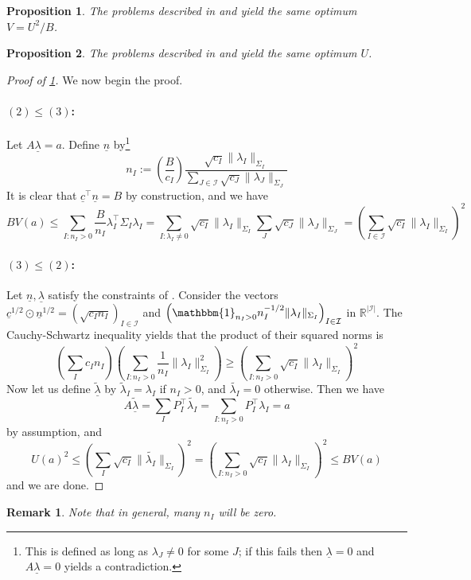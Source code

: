 \documentclass{article} %
\newcommand{\R}{\mathbb{R}}
\newtheorem{proposition}[proposition]{Proposition}
\newtheorem{remark}[theorem]{Remark}
\newcommand{\I}{\mathbbm{1}}
\begin{document}
\begin{proposition}\label{prop:og-primal}
    The problems described in  and  yield the same optimum $V=U^2/B$.
\end{proposition}
\begin{proposition}\label{prop:primal-dual}
    The problems described in  and  yield the same optimum $U$.
\end{proposition}
\begin{proof}[Proof of \cref{prop:og-primal}] We now begin the proof.
    \paragraph{$(2)\leq  (3)$:} Let $A\underline{\lambda}=a$. Define $\underline{n}$ by\footnote{This is defined as long as $\lambda_J\neq0$ for some $J$; if this fails then $\underline{\lambda}=0$ and $A\underline{\lambda}=0$ yields a contradiction.}
    \[
    n_I:=\left(\frac{B}{c_I}\right) \frac{\sqrt{c_I}\|\lambda_I\|_{\Sigma_I}}{\sum_{J\in\mathcal{I}} \sqrt{c_J} \|\lambda_J\|_{\Sigma_J}}
    \]
    It is clear that $\underline{c}^\top\underline{n}=B$ by construction, and we have
    \[
    BV(a) \leq \sum_{I:n_I>0} \frac{B}{n_I} \lambda_I^\top\Sigma_I\lambda_I = \sum_{I:\lambda_I\neq0} \sqrt{c_I}\|\lambda_I\|_{\Sigma_I} \sum_{J}\sqrt{c_J}\|\lambda_J\|_{\Sigma_J} = \left(\sum_{I\in\mathcal{I}}\sqrt{c_I}\|\lambda_I\|_{\Sigma_I}\right)^2
    \]
    \paragraph{$(3)\leq(2)$:} Let $\underline{n},\underline{\lambda}$ satisfy the constraints of . Consider the vectors $\underline{c}^{1/2}\odot \underline{n}^{1/2}=(\sqrt{c_In_I})_{I\in\mathcal{I}}$ and $\left(\I_{n_I>0}n_I^{-1/2} \|\lambda_I\|_{\Sigma_I}\right)_{I\in\mathcal{I}}$ in $\R^{|\mathcal{I}|}$. The Cauchy-Schwartz inequality yields that the product of their squared norms is
    \[
    \left(\sum_I c_In_I\right)\left(\sum_{I:n_I>0} \frac{1}{n_I}\|\lambda_I\|_{\Sigma_I}^2\right) \geq \left(\sum_{I:n_I>0} \sqrt{c_I}\|\lambda_I\|_{\Sigma_I}\right)^2
    \]
    Now let us define $\underline{\tilde{\lambda}}$ by $\tilde{\lambda}_I=\lambda_I$ if $n_I>0$, and $\tilde{\lambda_I}=0$ otherwise. Then we have
    \[
    A\underline{\tilde{\lambda}} = \sum_I P_I^\top\tilde{\lambda_I} = \sum_{I:n_I>0} P_I^\top\lambda_I=a
    \]
    by assumption, and
    \[
    U(a)^2\leq \left(\sum_I \sqrt{c_I}\|\tilde{\lambda_I}\|_{\Sigma_I}\right)^2 = \left(\sum_{I:n_I>0} \sqrt{c_I} \|\lambda_I\|_{\Sigma_I}\right)^2 \leq BV(a)
    \]
    and we are done.
\end{proof}
\begin{remark}
    Note that in general, many $n_I$ will be zero.
\end{remark}
\end{document}
